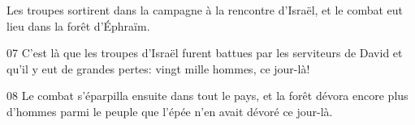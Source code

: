Les troupes sortirent dans la campagne à la rencontre d’Israël, et le combat eut lieu dans la forêt d’Éphraïm.

07 C’est là que les troupes d’Israël furent battues par les serviteurs de David et qu’il y eut de grandes pertes: vingt mille hommes, ce jour-là!

08 Le combat s’éparpilla ensuite dans tout le pays, et la forêt dévora encore plus d’hommes parmi le peuple que l’épée n’en avait dévoré ce jour-là.
